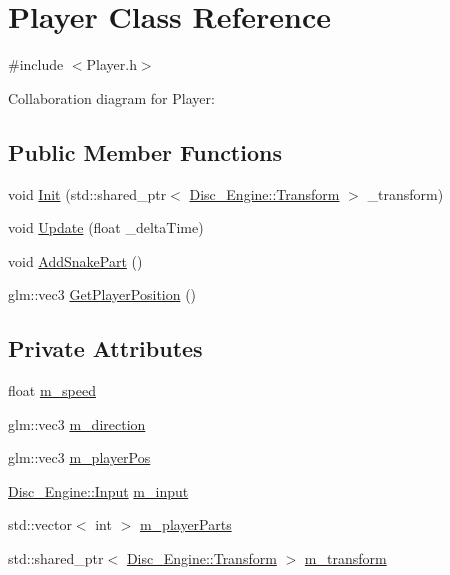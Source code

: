 \hypertarget{class_player}{}\section{Player Class Reference}
\label{class_player}


{\ttfamily \#include $<$Player.\+h$>$}



Collaboration diagram for Player\+:
\subsection*{Public Member Functions}
\begin{DoxyCompactItemize}
\item 
void \mbox{\hyperlink{class_player_a27da2c33057c830285cb9727fe76d935}{Init}} (std\+::shared\+\_\+ptr$<$ \mbox{\hyperlink{class_disc___engine_1_1_transform}{Disc\+\_\+\+Engine\+::\+Transform}} $>$ \+\_\+transform)
\item 
void \mbox{\hyperlink{class_player_ac6cfd11d9908832675a20967951ba72f}{Update}} (float \+\_\+delta\+Time)
\item 
void \mbox{\hyperlink{class_player_a58bb36e752a92fd5758900e49cdab663}{Add\+Snake\+Part}} ()
\item 
glm\+::vec3 \mbox{\hyperlink{class_player_a3c32ec6529ebd0e72bd286f80f01ebea}{Get\+Player\+Position}} ()
\end{DoxyCompactItemize}
\subsection*{Private Attributes}
\begin{DoxyCompactItemize}
\item 
float \mbox{\hyperlink{class_player_ac872b310930295033b218f1551a27e34}{m\+\_\+speed}}
\item 
glm\+::vec3 \mbox{\hyperlink{class_player_aa40fff5ae7b3c916b7e2f8702e18165a}{m\+\_\+direction}}
\item 
glm\+::vec3 \mbox{\hyperlink{class_player_a3e452f529d00cfbb48cfd2d7b31bd3e7}{m\+\_\+player\+Pos}}
\item 
\mbox{\hyperlink{class_disc___engine_1_1_input}{Disc\+\_\+\+Engine\+::\+Input}} \mbox{\hyperlink{class_player_a14938c76d5d02878d37cb55188bd153f}{m\+\_\+input}}
\item 
std\+::vector$<$ int $>$ \mbox{\hyperlink{class_player_afa409f38614a07bf775127cd5aa23e55}{m\+\_\+player\+Parts}}
\item 
std\+::shared\+\_\+ptr$<$ \mbox{\hyperlink{class_disc___engine_1_1_transform}{Disc\+\_\+\+Engine\+::\+Transform}} $>$ \mbox{\hyperlink{class_player_a142e036a5be744cf38af08b56f1bf17b}{m\+\_\+transform}}
\end{DoxyCompactItemize}


